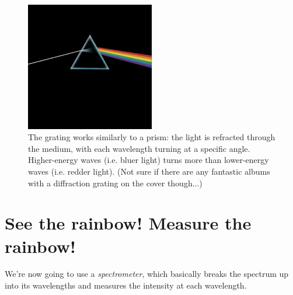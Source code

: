 \begin{figure}
\label{fig:grating}
       \centering
       \includegraphics[width=0.5\textwidth]{inventing-color/prism.png}
       \caption{The grating works similarly to a prism: the light is refracted
through the medium, with each wavelength turning at a specific angle.
Higher-energy waves (i.e. bluer light) turns more than lower-energy waves (i.e.
redder light). (Not sure if there are any fantastic albums with a diffraction
grating on the cover though...)}
\end{figure}

\section{See the rainbow! Measure the rainbow!}
\noindent
{}
\hspace{0.3cm}

We're now going to use a \emph{spectrometer}, which basically breaks the
spectrum up into its wavelengths and measures the intensity at each wavelength.

